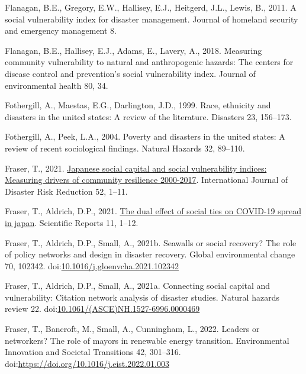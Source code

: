 \documentclass[]{elsarticle} %
\newlength{\cslhangindent}
\newlength{\cslentryspacingunit} %
\newenvironment{CSLReferences}[2] %
 {%
  \setlength{\parindent}{0pt}
  \ifodd #1
  \let\oldpar\par
  \def\par{\hangindent=\cslhangindent\oldpar}
  \fi
  \setlength{\parskip}{#2\cslentryspacingunit}
 }%
 {}
\begin{document}
\begin{CSLReferences}{1}{0}
\leavevmode{}%
Flanagan, B.E., Gregory, E.W., Hallisey, E.J., Heitgerd, J.L., Lewis,
B., 2011. A social vulnerability index for disaster management. Journal
of homeland security and emergency management 8.

\leavevmode{}%
Flanagan, B.E., Hallisey, E.J., Adams, E., Lavery, A., 2018. Measuring
community vulnerability to natural and anthropogenic hazards: The
centers for disease control and prevention's social vulnerability index.
Journal of environmental health 80, 34.

\leavevmode{}%
Fothergill, A., Maestas, E.G., Darlington, J.D., 1999. Race, ethnicity
and disasters in the united states: A review of the literature.
Disasters 23, 156--173.

\leavevmode{}%
Fothergill, A., Peek, L.A., 2004. Poverty and disasters in the united
states: A review of recent sociological findings. Natural Hazards 32,
89--110.

\leavevmode{}%
Fraser, T., 2021.
\href{https://doi.org/10.1016/j.ijdrr.2020.101965}{Japanese social
capital and social vulnerability indices: Measuring drivers of community
resilience 2000-2017}. International Journal of Disaster Risk Reduction
52, 1--11.

\leavevmode{}%
Fraser, T., Aldrich, D.P., 2021.
\href{https://doi.org/10.1038/s41598-021-81001-4}{The dual effect of
social ties on COVID-19 spread in japan}. Scientific Reports 11, 1--12.

\leavevmode{}%
Fraser, T., Aldrich, D.P., Small, A., 2021b. Seawalls or social
recovery? The role of policy networks and design in disaster recovery.
Global environmental change 70, 102342.
doi:\href{https://doi.org/10.1016/j.gloenvcha.2021.102342}{10.1016/j.gloenvcha.2021.102342}

\leavevmode{}%
Fraser, T., Aldrich, D.P., Small, A., 2021a. Connecting social capital
and vulnerability: Citation network analysis of disaster studies.
Natural hazards review 22.
doi:\href{https://doi.org/10.1061/(ASCE)NH.1527-6996.0000469}{10.1061/(ASCE)NH.1527-6996.0000469}

\leavevmode{}%
Fraser, T., Bancroft, M., Small, A., Cunningham, L., 2022. Leaders or
networkers? The role of mayors in renewable energy transition.
Environmental Innovation and Societal Transitions 42, 301--316.
doi:\url{https://doi.org/10.1016/j.eist.2022.01.003}


\end{CSLReferences}
\end{document}
